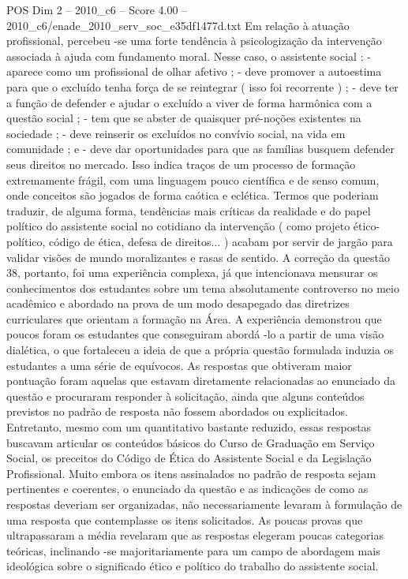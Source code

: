 \begin{textsample}{POS Dim 2 – 2010\_c6 – Score 4.00 – 2010\_c6/enade\_2010\_serv\_soc\_e35df1477d.txt}
Em relação à atuação profissional, percebeu -se uma forte tendência à psicologização da intervenção associada à ajuda com fundamento moral.
Nesse caso, o assistente social : - aparece como um profissional de olhar afetivo ; - deve promover a autoestima para que o excluído tenha força de se reintegrar ( isso foi recorrente ) ; - deve ter a função de defender e ajudar o excluído a viver de forma harmônica com a questão social ; - tem que se abster de quaisquer pré-noções existentes na sociedade ; - deve reinserir os excluídos no convívio social, na vida em comunidade ; e - deve dar oportunidades para que as famílias busquem defender seus direitos no mercado.
Isso indica traços de um processo de formação extremamente frágil, com uma linguagem pouco científica e de senso comum, onde conceitos são jogados de forma caótica e eclética.
Termos que poderiam traduzir, de alguma forma, tendências mais críticas da realidade e do papel político do assistente social no cotidiano da intervenção ( como projeto ético-político, código de ética, defesa de direitos... ) acabam por servir de jargão para validar visões de mundo moralizantes e rasas de sentido.
A correção da questão 38, portanto, foi uma experiência complexa, já que intencionava mensurar os conhecimentos dos estudantes sobre um tema absolutamente controverso no meio acadêmico e abordado na prova de um modo desapegado das diretrizes curriculares que orientam a formação na Área.
A experiência demonstrou que poucos foram os estudantes que conseguiram abordá -lo a partir de uma visão dialética, o que fortaleceu a ideia de que a própria questão formulada induzia os estudantes a uma série de equívocos.
As respostas que obtiveram maior pontuação foram aquelas que estavam diretamente relacionadas ao enunciado da questão e procuraram responder à solicitação, ainda que alguns conteúdos previstos no padrão de resposta não fossem abordados ou explicitados.
Entretanto, mesmo com um quantitativo bastante reduzido, essas respostas buscavam articular os conteúdos básicos do Curso de Graduação em Serviço Social, os preceitos do Código de Ética do Assistente Social e da Legislação Profissional.
Muito embora os itens assinalados no padrão de resposta sejam pertinentes e coerentes, o enunciado da questão e as indicações de como as respostas deveriam ser organizadas, não necessariamente levaram à formulação de uma resposta que contemplasse os itens solicitados.
As poucas provas que ultrapassaram a média revelaram que as respostas elegeram poucas categorias teóricas, inclinando -se majoritariamente para um campo de abordagem mais ideológica sobre o significado ético e político do trabalho do assistente social.

\end{textsample}

